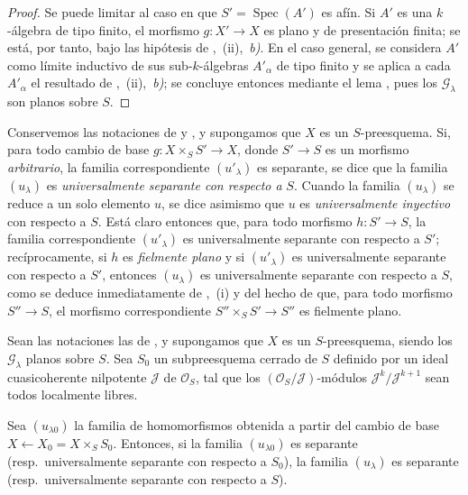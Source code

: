 \begin{proof}
Se puede limitar al caso en que $S'=\operatorname{Spec}(A')$ es afín.
Si $A'$ es una $k$-álgebra de tipo finito, el morfismo $g:X'\to X$ es plano y de presentación finita; se está, por tanto, bajo las hipótesis de ,~(ii),~\emph{b)}.
En el caso general, se considera $A'$ como límite inductivo de sus sub-$k$-álgebras $A'_\alpha$ de tipo finito y se aplica a cada $A'_\alpha$ el resultado de ,~(ii),~\emph{b)}; se concluye entonces mediante el lema , pues los $\mathcal G_\lambda$ son planos sobre $S$.
\end{proof}

\begin{env}[11.9.14]
\label{IV.11.9.14}
Conservemos las notaciones de  y , y supongamos que $X$ es un $S$-preesquema.
Si, para todo cambio de base $g:X\times_S S'\to X$, donde $S'\to S$ es un morfismo \emph{arbitrario}, la familia correspondiente $(u'_\lambda)$ es separante, se dice que la familia $(u_\lambda)$ es \emph{universalmente separante con respecto a} $S$.
Cuando la familia $(u_\lambda)$ se reduce a un solo elemento $u$, se dice asimismo que $u$ es \emph{universalmente inyectivo} con respecto a $S$.
Está claro entonces que, para todo morfismo $h:S'\to S$, la familia correspondiente $(u'_\lambda)$ es universalmente separante con respecto a $S'$; recíprocamente, si $h$ es \emph{fielmente plano} y si $(u'_\lambda)$ es universalmente separante con respecto a $S'$, entonces $(u_\lambda)$ es universalmente separante con respecto a $S$, como se deduce inmediatamente de ,~(i) y del hecho de que, para todo morfismo $S''\to S$, el morfismo correspondiente $S''\times_S S'\to S''$ es fielmente plano.
\end{env}




\begin{proposition}[11.9.15]
\label{IV.11.9.15}
Sean las notaciones las de , y supongamos que $X$ es un $S$-preesquema, siendo los $\mathcal G_\lambda$ planos sobre $S$.
Sea $S_0$ un subpreesquema cerrado de $S$ definido por un ideal cuasicoherente nilpotente $\mathcal J$ de $\mathcal O_S$, tal que los $(\mathcal O_S/\mathcal J)$-módulos $\mathcal J^k/\mathcal J^{k+1}$ sean todos localmente libres.

Sea $(u_{\lambda0})$ la familia de homomorfismos obtenida a partir del cambio de base $X\leftarrow X_0=X\times_S S_0$.
Entonces, si la familia $(u_{\lambda0})$ es separante \textup{(resp.}\ universalmente separante con respecto a $S_0$\textup{)}, la familia $(u_\lambda)$ es separante \textup{(resp.}\ universalmente separante con respecto a $S$\textup{)}.
\end{proposition}

